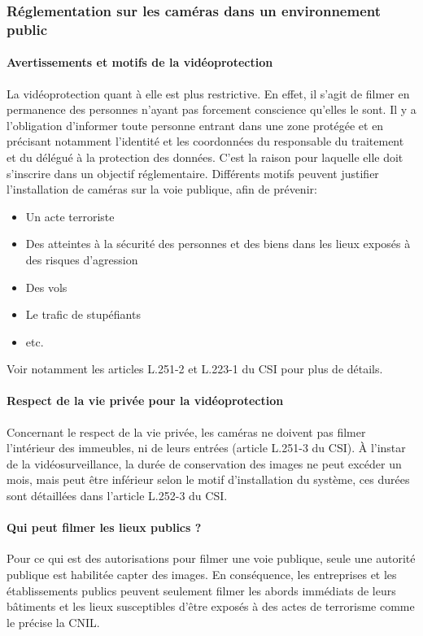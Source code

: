 \subsubsection{Réglementation sur les caméras dans un environnement public}
\label{sec:reglementation_publique}

\paragraph{Avertissements et motifs de la vidéoprotection}
\label{motifs_vidéoprotection}

La vidéoprotection quant à elle est plus restrictive. En effet, il s'agit de filmer en permanence des personnes n'ayant pas forcement conscience qu'elles le sont. 
Il y a l'obligation d'informer toute personne entrant dans une zone protégée et en précisant notamment l’identité et les coordonnées du responsable du traitement et du délégué à la protection des données.
C'est la raison pour laquelle elle doit s'inscrire dans un objectif réglementaire. Différents motifs peuvent justifier l'installation de caméras sur la voie publique, afin de prévenir:
\begin{itemize}
    \item Un acte terroriste
    \item Des atteintes à la sécurité des personnes et des biens dans les lieux exposés à des risques d'agression
    \item Des vols
    \item Le trafic de stupéfiants
    \item etc.
\end{itemize}
Voir notamment les articles L.251-2 et L.223-1 du \gls{CSI} pour plus de détails.

\paragraph{Respect de la vie privée pour la vidéoprotection}
\label{vp_vidéoprotection}

Concernant le respect de la vie privée, les caméras ne doivent pas filmer l'intérieur des immeubles, ni de leurs entrées (article L.251-3 du \gls{CSI}). 
À l'instar de la vidéosurveillance, la durée de conservation des images ne peut excéder un mois, 
mais peut être inférieur selon le motif d'installation du système, ces durées sont détaillées dans l'article L.252-3 du \gls{CSI}.

\paragraph{Qui peut filmer les lieux publics ?}
\label{autorisation_vidéoprotection}
Pour ce qui est des autorisations pour filmer une voie publique, seule une autorité publique est habilitée capter des images. 
En conséquence, les entreprises et les établissements publics peuvent seulement filmer les abords immédiats de leurs bâtiments 
et les lieux susceptibles d’être exposés à des actes de terrorisme comme le précise la \gls{CNIL}.

